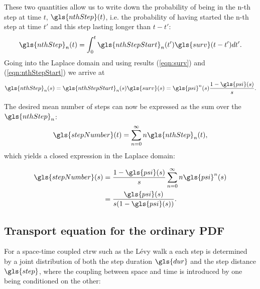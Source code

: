These two quantities allow us to write down the probability of being in the n-th step at time $t$, $\gls{nthStep}(t)$, i.e. the probability of having started the n-th step at time $t'$ and this step lasting longer than $t-t'$:
%
\begin{align}
\gls{nthStep}_n(t) = \int_{0}^{t} \gls{nthStepStart}_{n}(t') \gls{surv}(t-t') dt' .
\end{align}
%
Going into the Laplace domain and using results (\ref{eqn:surv}) and (\ref{eqn:nthStepStart}) we arrive at 
%
\begin{align}
\gls{nthStep}_n(s) =  \gls{nthStepStart}_{n}(s) \gls{surv}(s) = \gls{psi}^{n}(s)  \frac{1-\gls{psi}(s)}{s} .
\end{align}

The desired mean number of steps can now be expressed as the sum over the $\gls{nthStep}_n$:
%
\begin{align}
\gls{stepNumber}(t) = \sum_{n=0}^{\infty} n \gls{nthStep}_n(t) ,
\end{align}
%
which yields a closed expression in the Laplace domain:
%

\begin{align}
\gls{stepNumber}(s) & = \frac{1-\gls{psi}(s)}{s} \sum_{n=0}^{\infty} n \gls{psi}^{n}(s) \\
& =  \frac{\gls{psi}(s)}{s(1-\gls{psi}(s))} .
\end{align}





\subsection{Transport equation for the ordinary PDF}


For a space-time coupled \gls{ctrw} such as the L\'evy walk a each step is determined by a joint distribution of both the step duration $\gls{dur}$ and the step distance $\gls{step}$, where the coupling between space and time is introduced by one being conditioned on the other:

